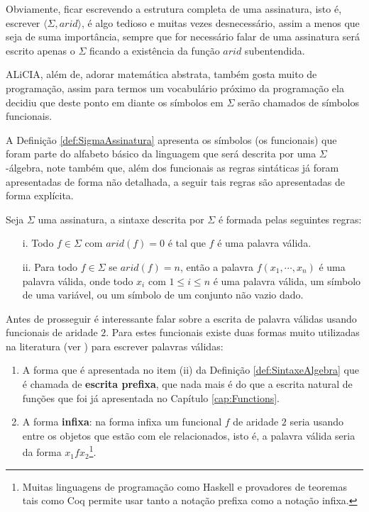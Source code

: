 Obviamente, ficar escrevendo a estrutura completa de uma assinatura, isto é, escrever $\langle \Sigma, arid \rangle$, é algo tedioso e muitas vezes desnecessário, assim a menos que seja de suma importância, sempre que for necessário falar de uma assinatura será escrito apenas o $\Sigma$ ficando a existência da função $arid$ subentendida.

\begin{nota}[Nomenclatura]
  ALiCIA, além de, adorar matemática abstrata, também gosta muito de programação, assim para termos um vocabulário próximo da programação ela decidiu que deste ponto em diante os símbolos em $\Sigma$ serão chamados de símbolos funcionais.
\end{nota}

A Definição \ref{def:SigmaAssinatura} apresenta os símbolos (os funcionais) que foram parte do alfabeto básico da linguagem que será descrita por uma $\Sigma$-álgebra, note também que, além dos funcionais as regras sintáticas já foram apresentadas de forma não detalhada, a seguir tais regras são apresentadas de forma explícita.

\begin{definicao}\label{def:SintaxeAlgebra}
  Seja $\Sigma$ uma assinatura, a sintaxe descrita por $\Sigma$ é formada pelas seguintes regras: 
  \begin{itemize}
    \item[i.] Todo $f \in \Sigma$ com $arid(f) = 0$ é tal que $f$ é uma palavra válida.
    \item[ii.] Para todo $f \in \Sigma$ se $arid(f) = n$, então a palavra $f(x_1, \cdots, x_n)$ é uma palavra válida, onde todo $x_i$ com $1 \leq i \leq n$ é uma palavra válida, um símbolo de uma variável, ou um símbolo de um conjunto não vazio dado.
  \end{itemize}
\end{definicao}

Antes de prosseguir é interessante falar sobre a escrita de palavra válidas usando funcionais de aridade $2$. Para estes funcionais existe duas formas muito utilizadas na literatura (ver \cite{klaus2001, stanley1981}) para escrever palavras válidas: 

\begin{enumerate}
  \item A forma que é apresentada no item (ii) da Definição \ref{def:SintaxeAlgebra} que é chamada de \textbf{escrita prefixa}, que nada mais é do que a escrita natural de funções que foi já apresentada no Capítulo \ref{cap:Functions}. 
  \item A forma \textbf{infixa}: na forma infixa um funcional $f$ de aridade $2$ seria usando entre os objetos que estão com ele relacionados, isto é, a palavra válida seria da forma $x_1 f x_2$\footnote{Muitas linguagens de programação como Haskell \cite{learnHaskell2011, beginningHaskell} e provadores de teoremas tais como Coq \cite{coq2013} permite usar tanto a notação prefixa como a notação infixa.}.
\end{enumerate}

